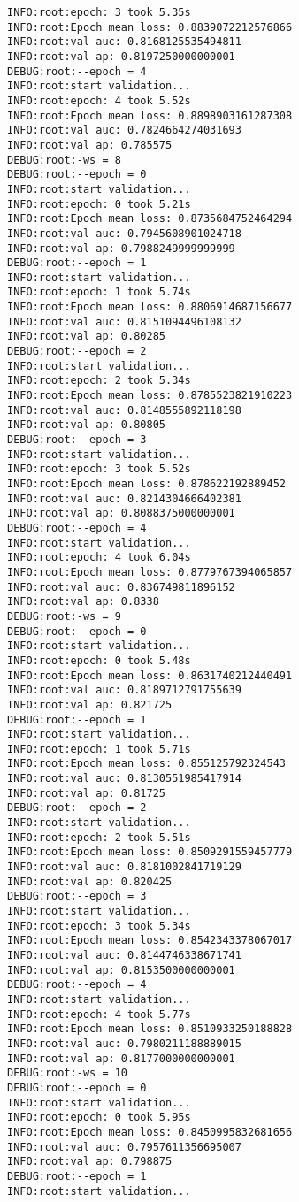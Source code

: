 \documentclass[11pt]{article}
\begin{document}
\begin{verbatim}
INFO:root:epoch: 3 took 5.35s
INFO:root:Epoch mean loss: 0.8839072212576866
INFO:root:val auc: 0.8168125535494811
INFO:root:val ap: 0.8197250000000001
DEBUG:root:--epoch = 4
INFO:root:start validation...
INFO:root:epoch: 4 took 5.52s
INFO:root:Epoch mean loss: 0.8898903161287308
INFO:root:val auc: 0.7824664274031693
INFO:root:val ap: 0.785575
DEBUG:root:-ws = 8
DEBUG:root:--epoch = 0
INFO:root:start validation...
INFO:root:epoch: 0 took 5.21s
INFO:root:Epoch mean loss: 0.8735684752464294
INFO:root:val auc: 0.7945608901024718
INFO:root:val ap: 0.7988249999999999
DEBUG:root:--epoch = 1
INFO:root:start validation...
INFO:root:epoch: 1 took 5.74s
INFO:root:Epoch mean loss: 0.8806914687156677
INFO:root:val auc: 0.8151094496108132
INFO:root:val ap: 0.80285
DEBUG:root:--epoch = 2
INFO:root:start validation...
INFO:root:epoch: 2 took 5.34s
INFO:root:Epoch mean loss: 0.8785523821910223
INFO:root:val auc: 0.8148555892118198
INFO:root:val ap: 0.80805
DEBUG:root:--epoch = 3
INFO:root:start validation...
INFO:root:epoch: 3 took 5.52s
INFO:root:Epoch mean loss: 0.878622192889452
INFO:root:val auc: 0.8214304666402381
INFO:root:val ap: 0.8088375000000001
DEBUG:root:--epoch = 4
INFO:root:start validation...
INFO:root:epoch: 4 took 6.04s
INFO:root:Epoch mean loss: 0.8779767394065857
INFO:root:val auc: 0.836749811896152
INFO:root:val ap: 0.8338
DEBUG:root:-ws = 9
DEBUG:root:--epoch = 0
INFO:root:start validation...
INFO:root:epoch: 0 took 5.48s
INFO:root:Epoch mean loss: 0.8631740212440491
INFO:root:val auc: 0.8189712791755639
INFO:root:val ap: 0.821725
DEBUG:root:--epoch = 1
INFO:root:start validation...
INFO:root:epoch: 1 took 5.71s
INFO:root:Epoch mean loss: 0.855125792324543
INFO:root:val auc: 0.8130551985417914
INFO:root:val ap: 0.81725
DEBUG:root:--epoch = 2
INFO:root:start validation...
INFO:root:epoch: 2 took 5.51s
INFO:root:Epoch mean loss: 0.8509291559457779
INFO:root:val auc: 0.8181002841719129
INFO:root:val ap: 0.820425
DEBUG:root:--epoch = 3
INFO:root:start validation...
INFO:root:epoch: 3 took 5.34s
INFO:root:Epoch mean loss: 0.8542343378067017
INFO:root:val auc: 0.8144746338671741
INFO:root:val ap: 0.8153500000000001
DEBUG:root:--epoch = 4
INFO:root:start validation...
INFO:root:epoch: 4 took 5.77s
INFO:root:Epoch mean loss: 0.8510933250188828
INFO:root:val auc: 0.7980211188889015
INFO:root:val ap: 0.8177000000000001
DEBUG:root:-ws = 10
DEBUG:root:--epoch = 0
INFO:root:start validation...
INFO:root:epoch: 0 took 5.95s
INFO:root:Epoch mean loss: 0.8450995832681656
INFO:root:val auc: 0.7957611356695007
INFO:root:val ap: 0.798875
DEBUG:root:--epoch = 1
INFO:root:start validation...

\end{verbatim}
\end{document}
